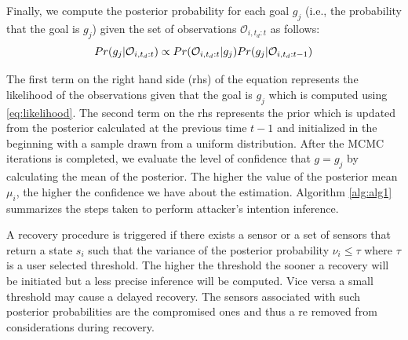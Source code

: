 \documentclass[letterpaper, 10 pt, conference]{ieeeconf}  %
\newcommand\NB[1]{$\spadesuit$\footnote{NB: #1}}
\begin{document}
Finally, we compute the posterior probability for each goal $g_j$ (i.e., the probability  that the goal is $g_j$) given the set of observations $\mathcal{O}_{i,t_d:t}$ as follows: %
\begin{equation} Pr(g_j|\mathcal{O}_{i,t_d:t}) \propto Pr(\mathcal{O}_{i,t_d:t} | g_j) \\ Pr(g_j|\mathcal{O}_{i,t_d:t-1})
\label{eqn:goal_posterior}
\end{equation}

The first term on the right hand side (rhs) of the equation represents the likelihood of the observations given that the goal is $g_j$ which is computed using \eqref{eq:likelihood}. The second term on the rhs represents the prior which is updated from the posterior calculated at the previous time $t-1$ and initialized in the beginning with a sample drawn from a uniform distribution.
After the MCMC iterations is completed, we evaluate the level of confidence that $g = g_j$ by calculating the mean of the posterior. The higher the value of the posterior mean $\mu_i$, the higher the confidence we have about the estimation. Algorithm \ref{alg:alg1} summarizes the steps taken to perform attacker's intention inference.

A recovery procedure is triggered if there exists a sensor or a set of sensors that return a state $s_i$ such that the variance of the posterior probability $\nu_i \leq \tau$ where $\tau$ is a user selected threshold. The higher the threshold the sooner a recovery will be initiated but a less precise inference will be computed. Vice versa a small threshold may cause a delayed recovery. The sensors associated with such posterior probabilities are the compromised ones and thus a re removed from considerations during recovery.

\end{document}
